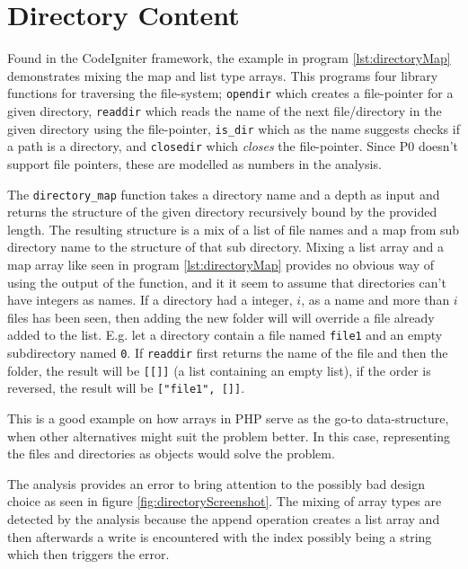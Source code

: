 \section{Directory Content}
\label{sec:directoryContent}
Found in the CodeIgniter framework, the example in program \ref{lst:directoryMap} demonstrates mixing the map and list type arrays. This programs four library functions for traversing the file-system; \texttt{opendir} which creates a file-pointer for a given directory, \texttt{readdir} which reads the name of the next file/directory in the given directory using the file-pointer, \texttt{is\_dir} which as the name suggests checks if a path is a directory, and \texttt{closedir} which \emph{closes} the file-pointer. Since P0 doesn't support file pointers, these are modelled as numbers in the analysis. 


The \texttt{directory\_map} function takes a directory name and a depth as input and returns the structure of the given directory recursively bound by the provided length. The resulting structure is a mix of a list of file names and a map from sub directory name to the structure of that sub directory. Mixing a list array and a map array like seen in program \ref{lst:directoryMap} provides no obvious way of using the output of the function, and it it seem to assume that directories can't have integers as names. If a directory had a integer, $i$, as a name and more than $i$ files has been seen, then adding the new folder will will override a file already added to the list. E.g. let a directory contain a file named \texttt{file1} and an empty subdirectory named \texttt{0}. If \texttt{readdir} first returns the name of the file and then the folder, the result will be \texttt{[[]]} (a list containing an empty list), if the order is reversed, the result will be \texttt{["file1", []]}.

This is a good example on how arrays in PHP serve as the go-to data-structure, when other alternatives might suit the problem better. In this case, representing the files and directories as objects would solve the problem.


The analysis provides an error to bring attention to the possibly bad design choice as seen in figure \ref{fig:directoryScreenshot}. The mixing of array types are detected by the analysis because the append operation creates a list array and then afterwards a write is encountered with the index possibly being a string which then triggers the error.

